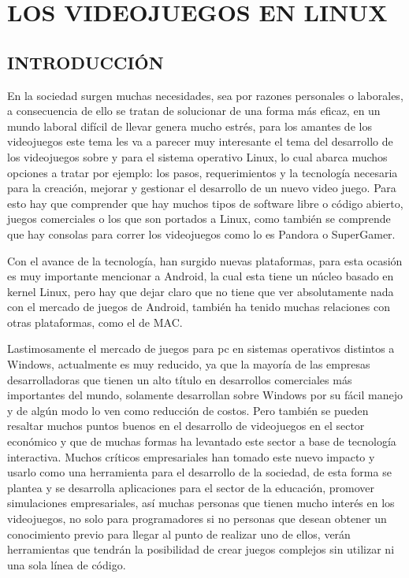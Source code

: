 \chapter*{LOS VIDEOJUEGOS EN LINUX}

\section*{INTRODUCCIÓN}
En la sociedad surgen muchas necesidades, sea por razones
personales o laborales, a consecuencia de ello se tratan de
solucionar de una forma más eficaz, en un mundo laboral difícil
de llevar genera mucho estrés, para los amantes de los
videojuegos este tema les va a parecer muy interesante el tema
del desarrollo de los videojuegos sobre y para el sistema
operativo Linux, lo cual abarca muchos opciones a tratar por
ejemplo: los pasos, requerimientos y la tecnología necesaria
para la creación, mejorar y gestionar el desarrollo de un nuevo
video juego. Para esto hay que comprender que hay muchos
tipos de software libre o código abierto, juegos comerciales o los
que son portados a Linux, como también se comprende que hay
consolas para correr los videojuegos como lo es Pandora o
SuperGamer.

Con el avance de la tecnología, han surgido nuevas plataformas,
para esta ocasión es muy importante mencionar a Android, la
cual esta tiene un núcleo basado en kernel Linux, pero hay que
dejar claro que no tiene que ver absolutamente nada con el
mercado de juegos de Android, también ha tenido muchas
relaciones con otras plataformas, como el de MAC.

Lastimosamente el mercado de juegos para pc en sistemas
operativos distintos a Windows, actualmente es muy reducido,
ya que la mayoría de las empresas desarrolladoras que tienen un
alto título en desarrollos comerciales más importantes del
mundo, solamente desarrollan sobre Windows por su fácil
manejo y de algún modo lo ven como reducción de costos.
Pero también se pueden resaltar muchos puntos buenos en el
desarrollo de videojuegos en el sector económico y que de
muchas formas ha levantado este sector a base de tecnología
interactiva. Muchos críticos empresariales han tomado este
nuevo impacto y usarlo como una herramienta para el
desarrollo de la sociedad, de esta forma se plantea y se
desarrolla aplicaciones para el sector de la educación, promover
simulaciones empresariales, así muchas personas que tienen
mucho interés en los videojuegos, no solo para programadores si
no personas que desean obtener un conocimiento previo para
llegar al punto de realizar uno de ellos, verán herramientas que
tendrán la posibilidad de crear juegos complejos sin utilizar ni
una sola línea de código.

